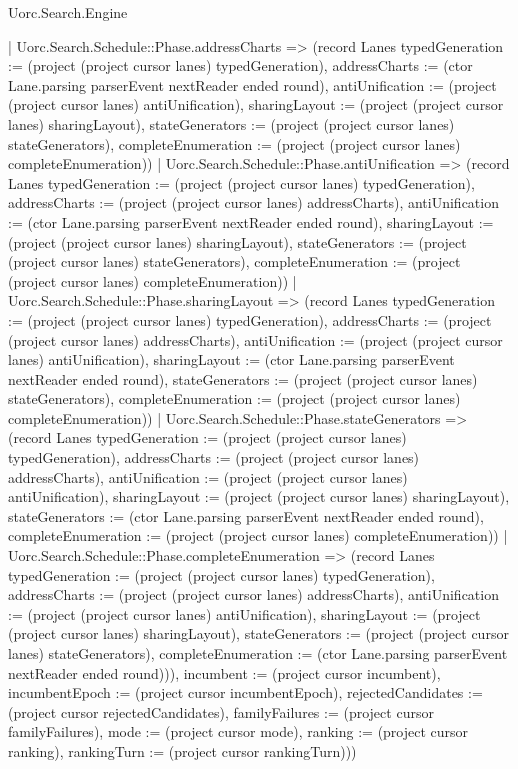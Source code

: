 \begin{lexlean}{Uorc.Search.Engine}
\begin{semanticmodule}
{{            | Uorc.Search.Schedule::Phase.addressCharts => (record Lanes {typedGeneration := (project (project cursor lanes) typedGeneration), addressCharts := (ctor Lane.parsing parserEvent nextReader ended round), antiUnification := (project (project cursor lanes) antiUnification), sharingLayout := (project (project cursor lanes) sharingLayout), stateGenerators := (project (project cursor lanes) stateGenerators), completeEnumeration := (project (project cursor lanes) completeEnumeration)})
            | Uorc.Search.Schedule::Phase.antiUnification => (record Lanes {typedGeneration := (project (project cursor lanes) typedGeneration), addressCharts := (project (project cursor lanes) addressCharts), antiUnification := (ctor Lane.parsing parserEvent nextReader ended round), sharingLayout := (project (project cursor lanes) sharingLayout), stateGenerators := (project (project cursor lanes) stateGenerators), completeEnumeration := (project (project cursor lanes) completeEnumeration)})
            | Uorc.Search.Schedule::Phase.sharingLayout => (record Lanes {typedGeneration := (project (project cursor lanes) typedGeneration), addressCharts := (project (project cursor lanes) addressCharts), antiUnification := (project (project cursor lanes) antiUnification), sharingLayout := (ctor Lane.parsing parserEvent nextReader ended round), stateGenerators := (project (project cursor lanes) stateGenerators), completeEnumeration := (project (project cursor lanes) completeEnumeration)})
            | Uorc.Search.Schedule::Phase.stateGenerators => (record Lanes {typedGeneration := (project (project cursor lanes) typedGeneration), addressCharts := (project (project cursor lanes) addressCharts), antiUnification := (project (project cursor lanes) antiUnification), sharingLayout := (project (project cursor lanes) sharingLayout), stateGenerators := (ctor Lane.parsing parserEvent nextReader ended round), completeEnumeration := (project (project cursor lanes) completeEnumeration)})
            | Uorc.Search.Schedule::Phase.completeEnumeration => (record Lanes {typedGeneration := (project (project cursor lanes) typedGeneration), addressCharts := (project (project cursor lanes) addressCharts), antiUnification := (project (project cursor lanes) antiUnification), sharingLayout := (project (project cursor lanes) sharingLayout), stateGenerators := (project (project cursor lanes) stateGenerators), completeEnumeration := (ctor Lane.parsing parserEvent nextReader ended round)})), incumbent := (project cursor incumbent), incumbentEpoch := (project cursor incumbentEpoch), rejectedCandidates := (project cursor rejectedCandidates), familyFailures := (project cursor familyFailures), mode := (project cursor mode), ranking := (project cursor ranking), rankingTurn := (project cursor rankingTurn)}))
}
\end{semanticmodule}
\end{lexlean}
